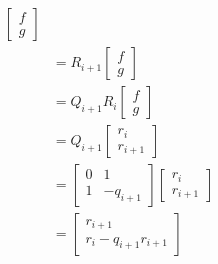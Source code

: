 \documentclass[11pt,a4paper]{article}
\begin{document}
\begin{enumerate}
\begin{enumerate}
\begin{align*}
\begin{bmatrix}
				                                                                         f                  \\ g                   \end{bmatrix}         \\
			                                                                    & = R_{i + 1}\begin{bmatrix}
				                                                                                 f                  \\ g                   \end{bmatrix} \\
			                                                                    & = Q_{i + 1}R_i\begin{bmatrix}
				                                                                                    f \\ g
			                                                                                    \end{bmatrix}                                       \\
			                                                                    & = Q_{i + 1}\begin{bmatrix}
				                                                                                 r_i \\ r_{i + 1}
			                                                                                 \end{bmatrix}                                         \\
			                                                                    & = \begin{bmatrix}
				                                                                        0 & 1 \\ 1 & -q_{i + 1}         \end{bmatrix} \begin{bmatrix}
				                                                                                                                      r_i \\ r_{i + 1}
			                                                                                                                      \end{bmatrix}    \\
			                                                                    & = \begin{bmatrix}
				                                                                        r_{i + 1} \\ r_i - q_{i + 1}r_{i + 1}

\end{bmatrix}
\end{align*}
\end{enumerate}
\end{enumerate}
\end{document}
